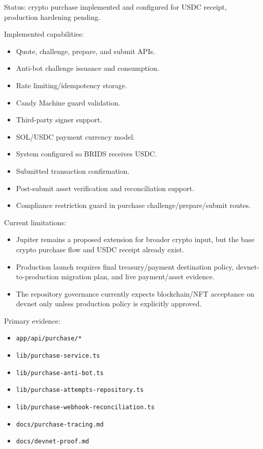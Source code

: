 \documentclass[
  10pt,
  letterpaper,
]{article}
\providecommand{\tightlist}{%
  \setlength{\itemsep}{0pt}\setlength{\parskip}{0pt}}
\let\oldtexttt\texttt
\renewcommand{\texttt}[1]{\oldtexttt{\small #1}}
\begin{document}
Status: crypto purchase implemented and configured for USDC receipt,
production hardening pending.

Implemented capabilities:

\begin{itemize}
\tightlist
\item
  Quote, challenge, prepare, and submit APIs.
\item
  Anti-bot challenge issuance and consumption.
\item
  Rate limiting/idempotency storage.
\item
  Candy Machine guard validation.
\item
  Third-party signer support.
\item
  SOL/USDC payment currency model.
\item
  System configured so BRIDS receives USDC.
\item
  Submitted transaction confirmation.
\item
  Post-submit asset verification and reconciliation support.
\item
  Compliance restriction guard in purchase challenge/prepare/submit
  routes.
\end{itemize}

Current limitations:

\begin{itemize}
\tightlist
\item
  Jupiter remains a proposed extension for broader crypto input, but the
  base crypto purchase flow and USDC receipt already exist.
\item
  Production launch requires final treasury/payment destination policy,
  devnet-to-production migration plan, and live payment/asset evidence.
\item
  The repository governance currently expects blockchain/NFT acceptance
  on devnet only unless production policy is explicitly approved.
\end{itemize}

Primary evidence:

\begin{itemize}
\tightlist
\item
  \texttt{app/api/purchase/*}
\item
  \texttt{lib/purchase-service.ts}
\item
  \texttt{lib/purchase-anti-bot.ts}
\item
  \texttt{lib/purchase-attempts-repository.ts}
\item
  \texttt{lib/purchase-webhook-reconciliation.ts}
\item
  \texttt{docs/purchase-tracing.md}
\item
  \texttt{docs/devnet-proof.md}
\end{itemize}
\end{document}
